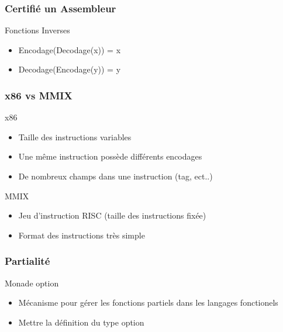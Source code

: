 \documentclass{beamer}
\begin{document}
\begin{frame}
\frametitle{Certifié un Assembleur}



\begin{block}{Fonctions Inverses}
\begin{itemize}
    \item Encodage(Decodage(x)) = x
    \item Decodage(Encodage(y)) = y 
\end{itemize}  
\end{block}

\end{frame}

\begin{frame}
\frametitle{x86 vs MMIX}

\begin{block}{x86}
  \begin{itemize}
    \item Taille des instructions variables
    \item Une même instruction possède différents encodages
    \item De nombreux champs dans une instruction (tag, ect..)
    \end{itemize}  
\end{block}

\begin{block}{MMIX}
  \begin{itemize}
  \item Jeu d'instruction RISC (taille des instructions fixée)
  \item Format des instructions très simple
  \end{itemize}  
\end{block}

\vfill

\end{frame}
\begin{frame}[b,fragile]
\frametitle{Partialité} 

\begin{block}{Monade option}
  \begin{itemize}
  \item Mécanisme pour gérer les fonctions partiels dans les langages fonctionels
  \item Mettre la définition du type option     
  \end{itemize}  
\end{block}




\end{frame}
\end{document}
